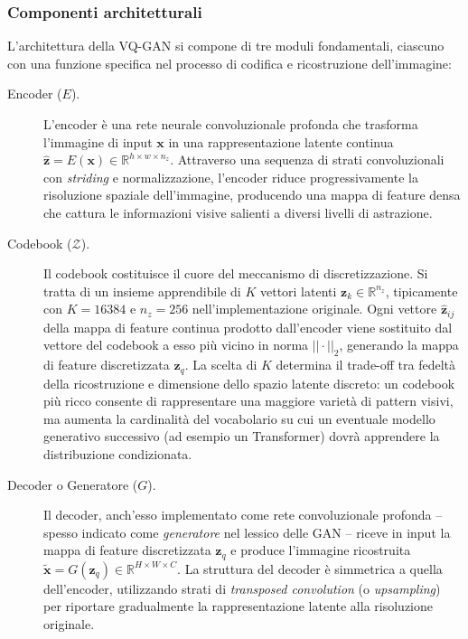 \subsubsection{Componenti architetturali}
L'architettura della VQ-GAN si compone di tre moduli fondamentali, ciascuno con una funzione specifica nel processo di codifica e ricostruzione dell'immagine:

\begin{description}
	\item[Encoder ($E$).] L'encoder è una rete neurale convoluzionale profonda che trasforma l'immagine di input $\mathbf{x}$ in una rappresentazione latente continua $\hat{\mathbf{z}} = E(\mathbf{x}) \in \mathbb{R}^{h \times w \times n_z}$. Attraverso una sequenza di strati convoluzionali con \emph{striding} e normalizzazione, l'encoder riduce progressivamente la risoluzione spaziale dell'immagine, producendo una mappa di feature densa che cattura le informazioni visive salienti a diversi livelli di astrazione.

	\item[Codebook ($\mathcal{Z}$).] Il codebook costituisce il cuore del meccanismo di discretizzazione. Si tratta di un insieme apprendibile di $K$ vettori latenti $\mathbf{z}_k \in \mathbb{R}^{n_z}$, tipicamente con $K = 16384$ e $n_z = 256$ nell'implementazione originale. Ogni vettore $\hat{\mathbf{z}}_{ij}$ della mappa di feature continua prodotto dall'encoder viene sostituito dal vettore del codebook a esso più vicino in norma $||\cdot||_2$, generando la mappa di feature discretizzata $\mathbf{z}_q$. La scelta di $K$ determina il trade-off tra fedeltà della ricostruzione e dimensione dello spazio latente discreto: un codebook più ricco consente di rappresentare una maggiore varietà di pattern visivi, ma aumenta la cardinalità del vocabolario su cui un eventuale modello generativo successivo (ad esempio un Transformer) dovrà apprendere la distribuzione condizionata.

	\item[Decoder o Generatore ($G$).] Il decoder, anch'esso implementato come rete convoluzionale profonda -- spesso indicato come \emph{generatore} nel lessico delle GAN -- riceve in input la mappa di feature discretizzata $\mathbf{z}_q$ e produce l'immagine ricostruita $\tilde{\mathbf{x}} = G(\mathbf{z}_q) \in \mathbb{R}^{H \times W \times C}$. La struttura del decoder è simmetrica a quella dell'encoder, utilizzando strati di \emph{transposed convolution} (o \emph{upsampling}) per riportare gradualmente la rappresentazione latente alla risoluzione originale.
\end{description}

